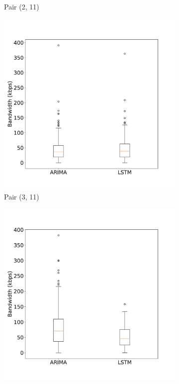 \begin{figure}
\begin{subfigure}{0.42\linewidth}
		\caption{Pair (2, 11)}
		\label{fig:BoxERRORprediction_1}
	\end{subfigure}
	\begin{subfigure}{0.42\linewidth}
		\centering
		\includegraphics[width=1\linewidth]{Pictures/Practical_Examples/BoxERRORprediction_2}
		\caption{Pair (3, 11)}
		\label{fig:BoxERRORprediction_2}
	\end{subfigure}
	\begin{subfigure}{0.42\linewidth}
		\centering
		\includegraphics[width=1\linewidth]{Pictures/Practical_Examples/BoxERRORprediction_3}

\end{subfigure}
\end{figure}
